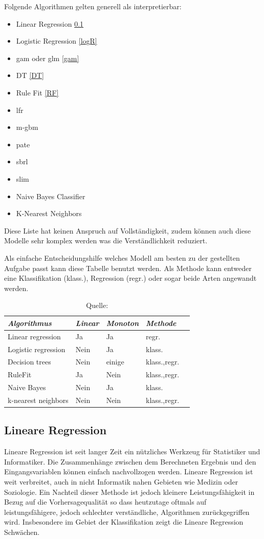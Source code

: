 \documentclass[
  12pt, %
  a4paper, %
  oneside, %
  openany, 
  numbers=noenddot, %
  BCOR=5mm, %
  parskip=half*, %
  thesis, %
]{bfhbook}
\begin{document}
Folgende Algorithmen gelten generell als interpretierbar:
\begin{itemize}
	\item Linear Regression \ref{lr}
	\item Logistic Regression \ref{logR}
	\item \acrfull{gam} oder \acrfull{glm} \ref{gam}
	\item \Gls{DT} \ref{DT}
	\item Rule Fit  \ref{RF}
	\item \acrfull{lfr}
	\item \acrfull{m-gbm}
	\item \acrfull{pate}	
	\item \acrfull{sbrl}
	\item \acrfull{slim}
	\item Naive Bayes Classifier
	\item K-Nearest Neighbors
\end{itemize}
Diese Liste hat keinen Anspruch auf Vollständigkeit, zudem können auch diese Modelle sehr komplex werden was die Verständlichkeit reduziert.

Als einfache Entscheidungshilfe welches Modell am besten zu der gestellten Aufgabe passt kann diese Tabelle benutzt werden. Als Methode kann entweder eine Klassifikation (klass.), Regression (regr.) oder sogar beide Arten angewandt werden.  \\
\begin{table}[ht]
\begin{tabular}{@{} *5l @{}}    \toprule
	\emph{Algorithmus} & \emph{Linear} & \emph{Monoton} & \emph{Methode}  \\\midrule
	Linear regression & Ja & Ja & 	regr. \\
	Logistic regression & Nein & Ja & 	klass. \\
	Decision trees & Nein & einige &	klass.,regr. \\
	RuleFit & Ja & Nein & 	klass.,regr. \\
	Naive Bayes	 & Nein & Ja & 	klass. \\
	k-nearest neighbors & Nein & Nein & klass.,regr. \\ \bottomrule
	 \hline
\end{tabular}
\caption*{Quelle: \parencite{iML}}
\end{table}

\subsection{Lineare Regression}
\label{lr}
Lineare Regression ist seit langer Zeit ein nützliches Werkzeug für Statistiker und Informatiker. Die Zusammenhänge zwischen dem Berechneten Ergebnis und den Eingangsvariablen können einfach nachvollzogen werden. Lineare Regression ist weit verbreitet, auch in nicht Informatik nahen Gebieten wie Medizin oder Soziologie. Ein Nachteil dieser Methode ist jedoch kleinere Leistungsfähigkeit in Bezug auf die Vorhersagequalität so dass heutzutage oftmals auf leistungsfähigere, jedoch schlechter verständliche, Algorithmen zurückgegriffen wird. Insbesondere im Gebiet der Klassifikation zeigt die Lineare Regression Schwächen.
\end{document}
